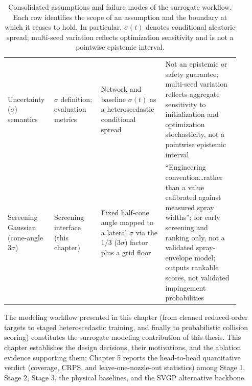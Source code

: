 \begin{table}[!ht]
\begin{tabular}{@{}L{0.15\linewidth}L{0.19\linewidth}L{0.26\linewidth}L{0.30\linewidth}@{}}
\addlinespace
Uncertainty ($\sigma$) semantics & $\sigma$ definition; evaluation metrics & Network and baseline $\sigma(t)$ as a heteroscedastic conditional spread & Not an epistemic or safety guarantee; multi-seed variation reflects aggregate sensitivity to initialization and optimization stochasticity, not a pointwise epistemic interval \\
\addlinespace
Screening Gaussian (cone-angle $3\sigma$) & Screening interface (this chapter) & Fixed half-cone angle mapped to a lateral $\sigma$ via the $1/3$ ($3\sigma$) factor plus a grid floor & ``Engineering convention\ldots rather than a value calibrated against measured spray widths''; for early screening and ranking only, not a validated spray-envelope model; outputs rankable scores, not validated impingement probabilities \\
\bottomrule
\end{tabular}
\caption{Consolidated assumptions and failure modes of the surrogate workflow. Each row identifies the scope of an assumption and the boundary at which it ceases to hold. In particular, $\sigma(t)$ denotes conditional aleatoric spread; multi-seed variation reflects optimization sensitivity and is not a pointwise epistemic interval.}
\label{tab:ch4-assumptions}
\end{table}
\FloatBarrier

The modeling workflow presented in this chapter (from cleaned reduced-order targets to staged heteroscedastic training, and finally to probabilistic collision scoring) constitutes the surrogate modeling contribution of this thesis. This chapter establishes the design decisions, their motivations, and the ablation evidence supporting them; Chapter 5 reports the head-to-head quantitative verdict (coverage, CRPS, and leave-one-nozzle-out statistics) among Stage 1, Stage 2, Stage 3, the physical baselines, and the SVGP alternative backbone.
